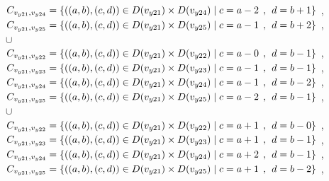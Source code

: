 \\$C_{v_{y21},v_{y24}}=\{((a,b),(c,d))\in D(v_{y21}) \times D(v_{y24})\mid c = a - 2\hspace{1ex} , \hspace{1ex}  d = b + 1 \}$ , 
\\$C_{v_{y21},v_{y25}}=\{((a,b),(c,d))\in D(v_{y21}) \times D(v_{y25})\mid c = a - 1\hspace{1ex} , \hspace{1ex}  d = b + 2 \}$ , 
\\$\cup$
\\$C_{v_{y21},v_{y22}}=\{((a,b),(c,d))\in D(v_{y21}) \times D(v_{y22})\mid c = a - 0\hspace{1ex} , \hspace{1ex}  d = b - 1 \}$ , 
\\$C_{v_{y21},v_{y23}}=\{((a,b),(c,d))\in D(v_{y21}) \times D(v_{y23})\mid c = a - 1\hspace{1ex} , \hspace{1ex}  d = b - 1 \}$ , 
\\$C_{v_{y21},v_{y24}}=\{((a,b),(c,d))\in D(v_{y21}) \times D(v_{y24})\mid c = a - 1\hspace{1ex} , \hspace{1ex}  d = b - 2 \}$ , 
\\$C_{v_{y21},v_{y25}}=\{((a,b),(c,d))\in D(v_{y21}) \times D(v_{y25})\mid c = a - 2\hspace{1ex} , \hspace{1ex}  d = b - 1 \}$ , 
\\$\cup$
\\$C_{v_{y21},v_{y22}}=\{((a,b),(c,d))\in D(v_{y21}) \times D(v_{y22})\mid c = a + 1\hspace{1ex} , \hspace{1ex}  d = b - 0 \}$ , 
\\$C_{v_{y21},v_{y23}}=\{((a,b),(c,d))\in D(v_{y21}) \times D(v_{y23})\mid c = a + 1\hspace{1ex} , \hspace{1ex}  d = b - 1 \}$ , 
\\$C_{v_{y21},v_{y24}}=\{((a,b),(c,d))\in D(v_{y21}) \times D(v_{y24})\mid c = a + 2\hspace{1ex} , \hspace{1ex}  d = b - 1 \}$ , 
\\$C_{v_{y21},v_{y25}}=\{((a,b),(c,d))\in D(v_{y21}) \times D(v_{y25})\mid c = a + 1\hspace{1ex} , \hspace{1ex}  d = b - 2 \}$ , 
